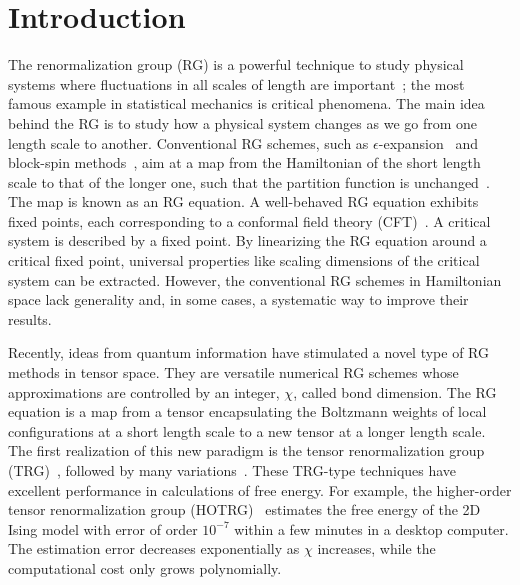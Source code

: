 \documentclass[aps,prb,reprint,superscriptaddress,floatfix]{revtex4-2}
\begin{document}
\maketitle

\section{Introduction\label{intro}}
The renormalization group (RG) is a powerful technique to study physical systems where fluctuations in all scales of length are important~\cite{wilsonNobel}; the most famous example in statistical mechanics is critical phenomena.
The main idea behind the RG is to study how a physical system changes as we go from one length scale to another.
Conventional RG schemes, such as $\epsilon$-expansion~\cite{wilson1972} and block-spin methods~\cite{kadanoff1966,kadanoff1975,migdal,kadanoff1976,niemeijer1973}, aim at a map from the Hamiltonian of the short length scale to that of the longer one, such that the partition function is unchanged~\cite{nonlinearRG}.
The map is known as an RG equation. 
A well-behaved RG equation exhibits fixed points, each corresponding to a conformal field theory (CFT)~\cite{polchinski1988,nakayama2015}.
A critical system is described by a fixed point.
By linearizing the RG equation around a critical fixed point, universal properties like scaling dimensions of the critical system can be extracted.
However, the conventional RG schemes in Hamiltonian space lack generality and, in some cases, a systematic way to improve their results.
%

Recently, ideas from quantum information have stimulated a novel type of RG methods in tensor space.
They are versatile numerical RG schemes whose approximations are controlled by an integer, $\chi$, called bond dimension.
The RG equation is a map from a tensor encapsulating the Boltzmann weights of local configurations at a short length scale to a new tensor at a longer length scale.
The first realization of this new paradigm is the tensor renormalization group (TRG)~\cite{trg}, followed by many variations~\cite{SRGa,SRGb,hotrg,atrg, triadtrg,morita2020global}.
These TRG-type techniques have excellent performance in calculations of free energy. 
For example, the higher-order tensor renormalization group (HOTRG)~\cite{hotrg} estimates the free energy of the 2D Ising model with error of order $10^{-7}$ within a few minutes in a desktop computer.
The estimation error decreases exponentially as $\chi$ increases, while the computational cost only grows polynomially.
%
\end{document}

